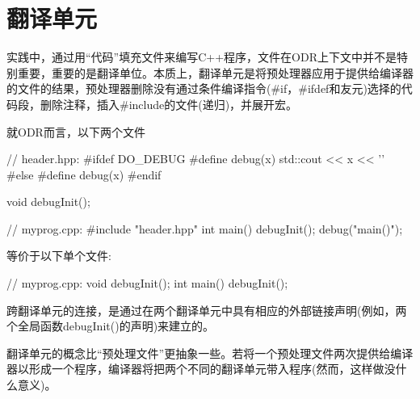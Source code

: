 \section{翻译单元}
实践中，通过用“代码”填充文件来编写C++程序，文件在ODR上下文中并不是特别重要，重要的是翻译单位。本质上，翻译单元是将预处理器应用于提供给编译器的文件的结果，预处理器删除没有通过条件编译指令(\#if，\#ifdef和友元)选择的代码段，删除注释，插入\#include的文件(递归)，并展开宏。

就ODR而言，以下两个文件

\begin{cpp}
// header.hpp:
#ifdef DO_DEBUG
#define debug(x) std::cout << x << ’\n’
#else
#define debug(x)
#endif

void debugInit();

// myprog.cpp:
#include "header.hpp"
int main()
{
	debugInit();
	debug("main()");
}
\end{cpp}

等价于以下单个文件:

\begin{cpp}
// myprog.cpp:
void debugInit();
int main()
{
	debugInit();
}
\end{cpp}

跨翻译单元的连接，是通过在两个翻译单元中具有相应的外部链接声明(例如，两个全局函数debugInit()的声明)来建立的。

翻译单元的概念比“预处理文件”更抽象一些。若将一个预处理文件两次提供给编译器以形成一个程序，编译器将把两个不同的翻译单元带入程序(然而，这样做没什么意义)。









































